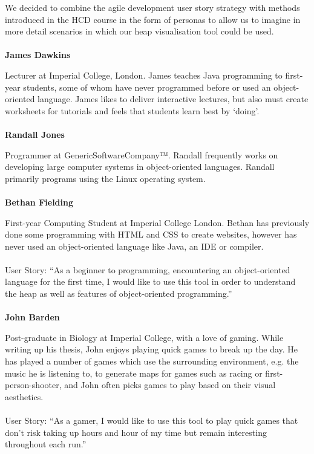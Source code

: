 \documentclass[10pt, a4paper]{article}
\begin{document}
We decided to combine the agile development user story strategy with methods introduced in the HCD course in the form of personas to allow us to imagine in more detail scenarios in which our heap visualisation tool could be used.
\\
\\ 
\textbf{James Dawkins} 

\noindent Lecturer at Imperial College, London. James teaches Java programming to first-year students, some of whom have never programmed before or used an object-oriented language. James likes to deliver interactive lectures, but also must create worksheets for tutorials and feels that students learn best by ‘doing’. 
\\
\\
\textbf{Randall Jones}

\noindent Programmer at GenericSoftwareCompany™. Randall frequently works on developing large computer systems in object-oriented languages. Randall primarily programs using the Linux operating system. 
\\
\\
\textbf{Bethan Fielding}

\noindent  First-year Computing Student at Imperial College London. Bethan has previously done some programming with HTML and CSS to create websites, however has never used an object-oriented language like Java, an IDE or compiler.
\\
\\
\noindent  User Story: “As a beginner to programming, encountering an object-oriented language for the first time, I would like to use this tool in order to understand the heap as well as features of object-oriented programming.”
\\
\\
\textbf{John Barden}

\noindent Post-graduate in Biology at Imperial College, with a love of gaming. While writing up his thesis, John enjoys playing quick games to break up the day. He has played a number of games which use the surrounding environment, e.g. the music he is listening to, to generate maps for games such as racing or first-person-shooter, and John often picks games to play based on their visual aesthetics.
\\
\\
\noindent User Story: “As a gamer, I would like to use this tool to play quick games that don’t risk taking up hours and hour of my time but remain interesting throughout each run.”
\\
\end{document}
